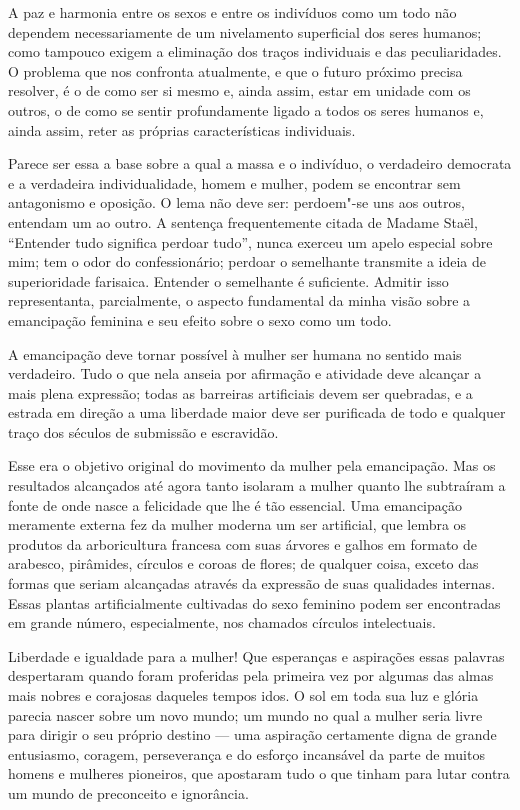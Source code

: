 A paz e harmonia entre os sexos e entre os indivíduos como um todo não
dependem necessariamente de um nivelamento superficial dos seres\label{ref6}
humanos; como tampouco exigem a eliminação dos traços individuais e das
peculiaridades. O problema que nos confronta atualmente, e que o futuro
próximo precisa resolver, é o de como ser si mesmo e, ainda assim, estar
em unidade com os outros, o de como se sentir profundamente ligado a
todos os seres humanos e, ainda assim, reter as próprias características
individuais.

Parece ser essa a base sobre a qual a massa e o indivíduo, o
verdadeiro democrata e a verdadeira individualidade, homem e mulher, podem se
encontrar sem antagonismo e oposição. O lema não deve ser: perdoem"-se
uns aos outros, entendam um ao outro. A sentença frequentemente citada
de Madame Staël, ``Entender tudo significa perdoar tudo'', nunca exerceu
um apelo especial sobre mim; tem o odor do confessionário; perdoar o
semelhante transmite a ideia de superioridade farisaica. Entender o
semelhante é suficiente. Admitir isso representanta,
parcialmente, o aspecto fundamental da minha visão sobre a emancipação feminina
e seu efeito sobre o sexo como um todo.

A emancipação deve tornar possível à mulher ser humana no sentido mais
verdadeiro. Tudo o que nela anseia por afirmação e atividade deve
alcançar a mais plena expressão; todas as barreiras artificiais devem
ser quebradas, e a estrada em direção a uma liberdade maior deve ser
purificada de todo e qualquer traço dos séculos de submissão e
escravidão.

Esse era o objetivo original do movimento da mulher pela emancipação.
Mas os resultados alcançados até agora tanto isolaram a mulher quanto
lhe subtraíram a fonte de onde nasce a felicidade que lhe é tão essencial.
Uma emancipação meramente externa fez da mulher moderna um ser
artificial, que lembra os produtos da arboricultura francesa com suas
árvores e galhos em formato de arabesco, pirâmides, círculos e coroas de
flores; de qualquer coisa, exceto das formas que seriam alcançadas
através da expressão de suas qualidades internas. Essas plantas
artificialmente cultivadas do sexo feminino podem ser encontradas em
grande número, especialmente, nos chamados círculos intelectuais. %

Liberdade e igualdade para a mulher! Que esperanças e aspirações essas
palavras despertaram quando foram proferidas pela primeira vez por
algumas das almas mais nobres e corajosas daqueles tempos idos. O sol em
toda sua luz e glória parecia nascer sobre um novo mundo; um mundo no
qual a mulher seria livre para dirigir o seu próprio destino --- uma
aspiração certamente digna de grande entusiasmo, coragem, perseverança e
do esforço incansável da parte de muitos homens e mulheres pioneiros,
que apostaram tudo o que tinham para lutar contra um mundo de
preconceito e ignorância.

